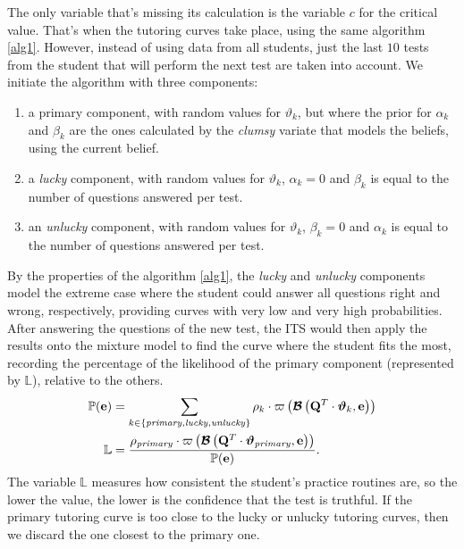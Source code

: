 \documentclass{article}
\newcommand{\0}{\mathbbold{0}}
\newcommand{\1}{\mathds{1}}
\begin{document}
The only variable that's missing its calculation is the variable $c$ for the critical value. That's when the tutoring curves take place, using the same algorithm \eqref{alg1}.
However, instead of using data from all students, just the last $10$ tests from the student that will perform the next test are taken into account. We initiate the algorithm with three components:
\begin{enumerate}
    \item a primary component, with random values for $\vartheta_k$, but where the prior for $\alpha_k$ and $\beta_k$ are the ones calculated by the \textsl{clumsy} variate that models the beliefs, using the current belief.
    \item a \textsl{lucky} component, with random values for $\vartheta_k$, $\alpha_k = 0$ and $\beta_k$ is equal to the number of questions answered per test.
    \item an \textsl{unlucky} component, with random values for $\vartheta_k$, $\beta_k = 0$ and $\alpha_k$ is equal to the number of questions answered per test.
\end{enumerate}
By the properties of the algorithm \eqref{alg1}, the \textsl{lucky} and \textsl{unlucky} components model the extreme case where the student could answer all questions right and wrong, respectively, providing curves with very low and very high probabilities.
After answering the questions of the new test, the ITS would then apply the results onto the mixture model to find the curve where the student fits the most, recording the percentage of the likelihood of the primary component (represented by $\mathbb{L}$), relative to the others.
\begin{align*}
    \mathbb{P}({\bf e}) &= \sum_{k \in \left\{\mathit{primary},\mathit{lucky},\mathit{unlucky}\right\}} \rho_k \cdot \varpi\left(\boldsymbol{\mathcal{B}}\left({\bf Q}^T \cdot \boldsymbol{\vartheta}_k, {\bf e}\right)\right) \\
    \mathbb{L} &= \frac{\rho_\mathit{primary} \cdot \varpi\left(\boldsymbol{\mathcal{B}}\left({\bf Q}^T \cdot \boldsymbol{\vartheta}_\mathit{primary}, {\bf e}\right)\right)}{\mathbb{P}({\bf e})}.
\end{align*}
The variable $\mathbb{L}$ measures how consistent the student's practice routines are, so the lower the value, the lower is the confidence that the test is truthful. If the primary tutoring curve is too close to the lucky or unlucky tutoring curves, then we discard the one closest to the primary one.
\end{document}
